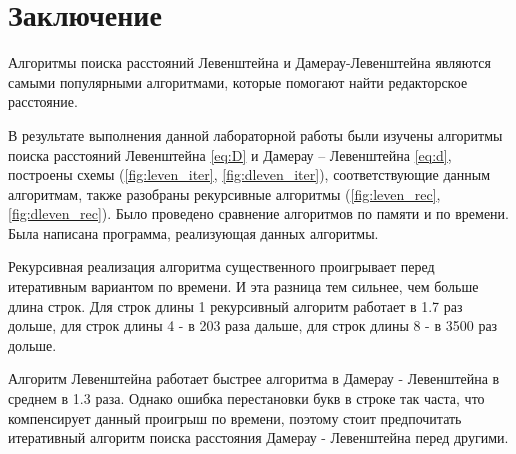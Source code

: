 \chapter*{Заключение}

    Алгоритмы поиска расстояний Левенштейна и Дамерау-Левенштейна являются самыми популярными алгоритмами, которые помогают найти редакторское расстояние.
    
    В результате выполнения данной лабораторной работы были изучены алгоритмы поиска расстояний Левенштейна \eqref{eq:D} и Дамерау – Левенштейна \eqref{eq:d}, построены схемы (\ref{fig:leven_iter}, \ref{fig:dleven_iter}), соответствующие данным алгоритмам, также разобраны рекурсивные алгоритмы (\ref{fig:leven_rec}, \ref{fig:dleven_rec}). Было проведено сравнение алгоритмов по памяти и по времени. Была написана программа, реализующая данных алгоритмы.
    
    Рекурсивная реализация алгоритма существенного проигрывает перед итеративным вариантом по времени. И эта разница тем сильнее, чем больше длина строк. Для строк длины 1 рекурсивный алгоритм работает в 1.7 раз дольше, для строк длины 4 - в 203 раза дальше, для строк длины 8 - в 3500 раз дольше.
    
    Алгоритм Левенштейна работает быстрее алгоритма в Дамерау - Левенштейна в среднем в 1.3 раза. Однако ошибка перестановки букв в строке так часта, что компенсирует данный проигрыш по времени, поэтому стоит предпочитать итеративный алгоритм поиска расстояния Дамерау - Левенштейна перед другими.
    